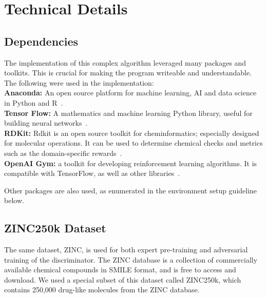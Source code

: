 \documentclass{article}
\begin{document}
\section{Technical Details}
\subsection{Dependencies}
The implementation of this complex algorithm leveraged many packages and toolkits. This is crucial for making the program writeable and understandable. The following were used in the implementation:\\
\textbf{Anaconda:} An open source platform for machine learning, AI and data science in Python and R~\cite{anacondaweb}.\\
\noindent\textbf{Tensor Flow:} A mathematics and machine learning Python library, useful for building neural networks~\cite{tfweb}.\\
\noindent\textbf{RDKit:} Rdkit is an open source toolkit for cheminformatics; especially designed for molecular operations. It can be used to determine chemical checks and metrics such as the domain-specific rewards~\cite{rdkitweb}.\\
\noindent\textbf{OpenAI Gym:} a toolkit for developing reinforcement learning algorithms. It is compatible with TensorFlow, as well as other libraries~\cite{gymweb}.

Other packages are also used, as enumerated in the environment setup guideline below.
\subsection{ZINC250k Dataset}
The same dataset, ZINC, is used for both expert pre-training and adversarial training of the discriminator. The ZINC database is a collection of commercially available chemical compounds in SMILE format, and is free to access and download. We used a special subset of this dataset called ZINC250k, which contains 250,000 drug-like molecules from the ZINC database.
\end{document}
